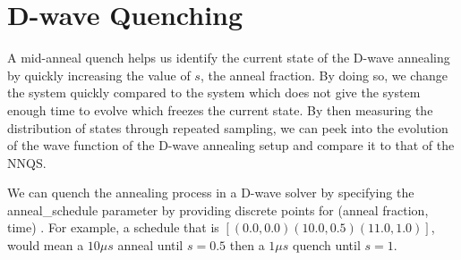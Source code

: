 \chapter{D-wave Quenching}\label{appendix:quenching}
A mid-anneal quench helps us identify the current state of the D-wave annealing by quickly increasing the value of $s$, the anneal fraction. By doing so, we change the system quickly compared to the system which does not give the system enough time to evolve which freezes the current state. By then measuring the distribution of states through repeated sampling, we can peek into the evolution of the wave function of the D-wave annealing setup and compare it to that of the NNQS.

We can quench the annealing process in a D-wave solver by specifying the anneal\_schedule parameter by providing discrete points for (anneal fraction, time) \cite{dwaveadvantage}. For example, a schedule that is $[(0.0,0.0)(10.0,0.5)(11.0,1.0)]$, would mean a $10 \mu s$ anneal until $s=0.5$ then a $1 \mu s$ quench until $s=1$.